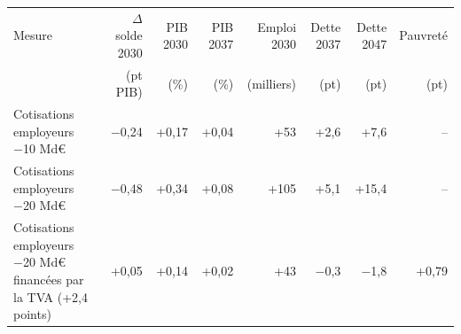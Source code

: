 \begin{tabular}{p{5.2cm}rrrrrrr}
\toprule
Mesure & $\Delta$solde 2030 & PIB 2030 & PIB 2037 & Emploi 2030 & Dette 2037 & Dette 2047 & Pauvreté \\
 & (pt PIB) & (\%) & (\%) & (milliers) & (pt) & (pt) & (pt) \\
\midrule
Cotisations employeurs −10 Md€ & $-$0{,}24 & +0{,}17 & +0{,}04 & +53 & +2{,}6 & +7{,}6 & -- \\
Cotisations employeurs −20 Md€ & $-$0{,}48 & +0{,}34 & +0{,}08 & +105 & +5{,}1 & +15{,}4 & -- \\
Cotisations employeurs −20 Md€ financées par la TVA (+2,4 points) & +0{,}05 & +0{,}14 & +0{,}02 & +43 & $-$0{,}3 & $-$1{,}8 & +0{,}79 \\
\bottomrule
\end{tabular}
